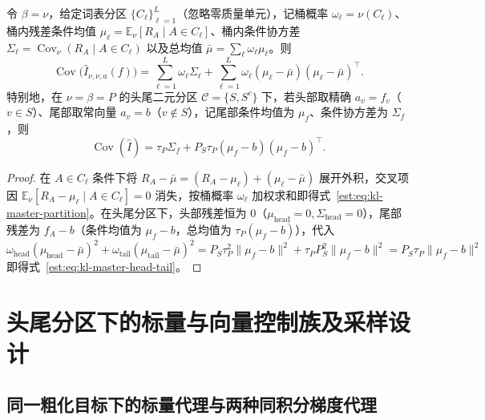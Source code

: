 \documentclass[lang=cn,scheme=chinese,openany]{elegantbook}
\newcommand{\E}{\mathbb E}
\newcommand{\tail}{\mathrm{tail}}
\begin{document}
\begin{theorem}
\label{est:thm:kl-master-partition}
令 $\beta=\nu$，给定词表分区 $\{C_\ell\}_{\ell=1}^L$（忽略零质量单元），记桶概率 $\omega_\ell=\nu(C_\ell)$、桶内残差条件均值 $\mu_\ell=\E_\nu[R_A\mid A\in C_\ell]$、桶内条件协方差 $\Sigma_\ell=\operatorname{Cov}_\nu(R_A\mid A\in C_\ell)$ 以及总均值 $\bar\mu=\sum_\ell\omega_\ell\mu_\ell$。则
\begin{equation}
 \operatorname{Cov}\bigl(\widehat I_{\nu,\nu,a}(f)\bigr)
 =\sum_{\ell=1}^L\omega_\ell\Sigma_\ell
  +\sum_{\ell=1}^L\omega_\ell(\mu_\ell-\bar\mu)(\mu_\ell-\bar\mu)^\top.
 \label{est:eq:kl-master-partition}
\end{equation}
特别地，在 $\nu=\beta=P$ 的头尾二元分区 $\mathcal C=\{S,S^c\}$ 下，若头部取精确 $a_v=f_v$（$v\in S$）、尾部取常向量 $a_v=b$（$v\notin S$），记尾部条件均值为 $\mu_f$、条件协方差为 $\Sigma_f$，则
\begin{equation}
 \operatorname{Cov}(\widehat I)
 =\tau_P\Sigma_f+P_S\tau_P(\mu_f-b)(\mu_f-b)^\top.
 \label{est:eq:kl-master-head-tail}
\end{equation}
\end{theorem}
\begin{proof}
在 $A\in C_\ell$ 条件下将 $R_A-\bar\mu=(R_A-\mu_\ell)+(\mu_\ell-\bar\mu)$ 展开外积，交叉项因 $\E_\nu[R_A-\mu_\ell\mid A\in C_\ell]=0$ 消失，按桶概率 $\omega_\ell$ 加权求和即得式~\eqref{est:eq:kl-master-partition}。在头尾分区下，头部残差恒为 $0$（$\mu_{\mathrm{head}}=0,\Sigma_{\mathrm{head}}=0$），尾部残差为 $f_A-b$（条件均值为 $\mu_f-b$，总均值为 $\tau_P(\mu_f-b)$），代入 $\omega_{\mathrm{head}}(\mu_{\mathrm{head}}-\bar\mu)^2+\omega_\tail(\mu_\tail-\bar\mu)^2=P_S\tau_P^2\|\mu_f-b\|^2+\tau_P P_S^2\|\mu_f-b\|^2=P_S\tau_P\|\mu_f-b\|^2$ 即得式~\eqref{est:eq:kl-master-head-tail}。
\end{proof}

\section{头尾分区下的标量与向量控制族及采样设计}
\label{est:partition-controls}
\label{est:sec:kl-scalar}
\label{est:sec:kl-vector}
\label{est:sec:kl-two-controls}
\label{est:sec:kl-sampling}

\subsection{同一粗化目标下的标量代理与两种同积分梯度代理}
\end{document}
